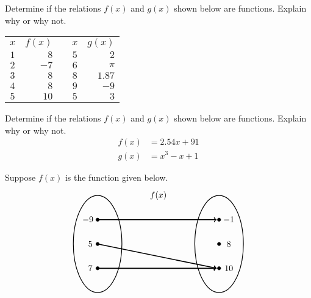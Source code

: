 \documentclass[11pt,letterpaper]{article}
\begin{document}
 Determine if the relations $f(x)$ and $g(x)$ shown below are functions. Explain why or why not. 
	\begin{table}[!ht]
	\centering
	\begin{tabular}{c|rcc|r}
	$x$ & $f(x)$ & \hspace{1cm} & $x$ & $g(x)$ \\ \cline{1-2} \cline{4-5}
	$1$ & $8$ & & $5$ & $2$ \\
	$2$ & $-7$ & & $6$ & $\pi$ \\
	$3$ & $8$ & & $8$ & $1.87$ \\
	$4$ & $8$ & & $9$ & $-9$ \\
	$5$ & $10$ & & $5$ & $3$
	\end{tabular}
	\end{table}



\newpage



 Determine if the relations $f(x)$ and $g(x)$ shown below are functions. Explain why or why not. 
	\[
	\begin{aligned}
	f(x)&= 2.54x + 91 \\[0.3cm]
	g(x)&= x^3 - x + 1
	\end{aligned}
	\]



\newpage



 Suppose $f(x)$ is the function given below.
	\[
	\begin{tikzpicture}
	\node at (2.5,2) {$f(x)$};
	\draw[line width=0.03cm] (0,0) circle (1 and 2);
	\draw[line width=0.03cm] (5,0) circle (1 and 2);
	
	\draw[fill=black] (0,1) circle (0.07);
	\draw[fill=black] (0,0) circle (0.07);
	\draw[fill=black] (0,-1) circle (0.07);
	
	\draw[fill=black] (5,1) circle (0.07);
	\draw[fill=black] (5,0) circle (0.07);
	\draw[fill=black] (5,-1) circle (0.07);
	
	\draw[line width=0.04cm,->] (0,1) -- (4.9,1);
	\draw[line width=0.04cm,->] (0,0) -- (4.9,-1);
	\draw[line width=0.04cm,->] (0,-1) -- (4.9,-1);
	
	\node at (-0.4,1) {$-9$};
	\node at (-0.3,0) {$5$};
	\node at (-0.3,-1) {$7$};
	
	\node at (5.4,1) {$-1$};
	\node at (5.4,0) {$8$};
	\node at (5.4,-1) {$10$};
	\end{tikzpicture}
	\]
\end{document}
